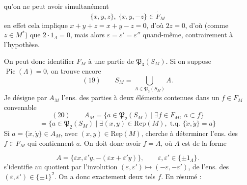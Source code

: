 \documentclass[11pt,a4paper]{article}
\begin{document}
qu'on ne peut avoir simultanément
\[
\{x,y,z\},\ \{x,y,-z\} \in \widetilde{F}_M
\]
en effet cela implique $x + y + z = x + y - z = 0$, d'où $2z = 0$, d'où (comme $z \in M^*$) que $2 \cdot 1_\Lambda = 0$, mais alors $\varepsilon = \varepsilon' = \varepsilon''$ quand-même, contrairement à l'hypothèse.

On peut donc identifier $F_M$ à une partie de $\mathfrak{P}_3(S_M)$. Si on suppose $\operatorname{Pic}(\Lambda) = 0$, on trouve encore
\[
(19)\qquad S_M = \bigcup_{A \in \mathfrak{P}_3(S_M)} A .
\]
Je désigne par $A_M$ l'ens. des parties à deux éléments  contenues dans un  $f \in F_M$ convenable
\[
(20)\qquad A_M = \{ a \in \mathfrak{P}_2(S_M) \mid \exists f \in F_M,\ a \subset f \}
\]
\[
= \{ a \in \mathfrak{P}_2(S_M) \mid \exists (x,y) \in \mathrm{Rep}(M), \text{ t.q. } \{\dot{x}, \dot{y}\} = a \}
\]
 Si $a = \{\dot{x}, \dot{y}\} \in A_M$, avec $(x,y) \in \mathrm{Rep}(M)$,  cherche à déterminer l'ens. des $f \in F_M$ qui contiennent $a$. On doit donc avoir $f = \dot{A}$, où $A$ est de la forme

\[
A = \{ \varepsilon x, \varepsilon' y, -(\varepsilon x + \varepsilon' y) \}, \qquad \varepsilon, \varepsilon' \in \{\pm 1_\Lambda\} .
\]
  s'identifie au quotient par l'involution $(\varepsilon, \varepsilon') \longmapsto (-\varepsilon, -\varepsilon')$, de l'ens. des $(\varepsilon, \varepsilon') \in \{\pm 1\}^2$. On a donc exactement deux tels $f$. En résumé :
\end{document}
